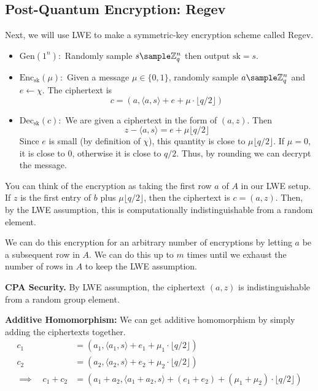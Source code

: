 \subsection{Post-Quantum Encryption: Regev}

Next, we will use LWE to make a symmetric-key encryption scheme called Regev.

\begin{itemize}
    \item $\text{Gen}(1^n):$ Randomly sample $s \sample \ZZ_q^n$ then output $\text{sk} = s$.
    \item $\text{Enc}_{\text{sk}}(\mu):$ Given a message $\mu \in \{0, 1\}$, randomly sample $a \sample \ZZ_q^n$ and $e \gets \chi$. The ciphertext is
    \[ c = (a, \langle a, s \rangle + e + \mu \cdot \lfloor q / 2 \rfloor)\]
    \item $\text{Dec}_\text{sk}(c):$ We are given a ciphertext in the form of $(a, z)$. Then \[ z - \langle a, s\rangle = e + \mu \lfloor q / 2 \rfloor\]
    Since $e$ is small (by definition of $\chi$), this quantity is close to $\mu \lfloor q/2 \rfloor $. If $\mu =0$, it is close to 0, otherwise it is close to $q/2$. Thus, by rounding we can decrypt the message.
\end{itemize}

You can think of the encryption as taking the first row $a$ of $A$ in our LWE setup. If $z$ is the first entry of $b$ plus $\mu \lfloor q/2 \rfloor$, then the ciphertext is $c = (a, z)$. Then, by the LWE assumption, this is computationally indistinguishable from a random element.

\begin{center}
    \def\svgwidth{0.75\columnwidth}
    
\end{center}

We can do this encryption for an arbitrary number of encryptions by letting $a$ be a subsequent row in $A$. We can do this up to $m$ times until we exhaust the number of rows in $A$ to keep the LWE assumption.

\textbf{CPA Security.} By LWE assumption, the ciphertext $(a, z)$ is indistinguishable from a random group element.

\textbf{Additive Homomorphism:} We can get additive homomorphism by simply adding the ciphertexts together.
\begin{align*}
    c_1 &= (a_1, \langle a_1, s\rangle + e_1 + \mu_1 \cdot \lfloor q/2 \rfloor)\\
    c_2 &= (a_2, \langle a_2, s \rangle + e_2 + \mu_2 \cdot \lfloor q/2 \rfloor)\\
    \implies \quad c_1 + c_2 &= (a_1 + a_2, \langle a_1 + a_2, s \rangle + (e_1 + e_2) + (\mu_1 + \mu_2) \cdot \lfloor q/2 \rfloor)
\end{align*}

